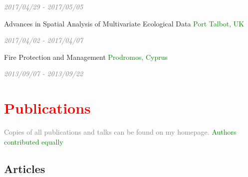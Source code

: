 \documentclass[hidelinks]{report}
\begin{document}
\hfill
\textcolor{grey}{\textit{2017/04/29 - 2017/05/05}}

Advances in Spatial Analysis of Multivariate Ecological Data
\hfill
\textcolor{green}{Port Talbot, UK}

\hfill
\textcolor{grey}{\textit{2017/04/02 - 2017/04/07}}

Fire Protection and Management
\hfill
\textcolor{green}{Prodromos, Cyprus}

\hfill
\textcolor{grey}{\textit{2013/09/07 - 2013/09/22}}


\section*{\textcolor{red}{Publications} \sout{\hfill}}

\textcolor{grey}{\footnotesize{Copies of all publications and talks can be found on my homepage.}}
\textcolor{green}{\footnotesize{\Cross \hspace{0.1em} Authors contributed equally}}

\subsection*{Articles}
\end{document}
